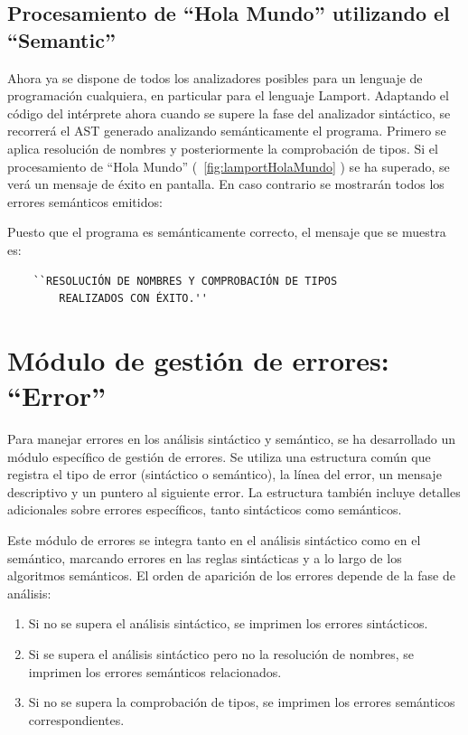 \subsection{Procesamiento de ``Hola Mundo'' utilizando el ``Semantic''}
Ahora ya se dispone de todos los analizadores posibles para un lenguaje de programación cualquiera, en particular para el lenguaje Lamport. Adaptando el código del intérprete ahora cuando se supere la fase del analizador sintáctico, se recorrerá el AST generado analizando semánticamente el programa. Primero se aplica resolución de nombres y posteriormente la comprobación de tipos. Si el procesamiento de ``Hola Mundo'' (~\ref{fig:lamportHolaMundo} ) se ha superado, se verá un mensaje de éxito en pantalla. En caso contrario se mostrarán todos los errores semánticos emitidos:



\noindent
Puesto que el programa es semánticamente correcto, el mensaje que se muestra es:
\begin{verbatim}
    ``RESOLUCIÓN DE NOMBRES Y COMPROBACIÓN DE TIPOS 
        REALIZADOS CON ÉXITO.''
\end{verbatim}

\section{Módulo de gestión de errores: ``Error''}\label{sec:implementacionError}
Para manejar errores en los análisis sintáctico y semántico, se ha desarrollado un módulo específico de gestión de errores. Se utiliza una estructura común  que registra el tipo de error (sintáctico o semántico), la línea del error, un mensaje descriptivo y un puntero al siguiente error. La estructura también incluye detalles adicionales sobre errores específicos, tanto sintácticos como semánticos.

Este módulo de errores se integra tanto en el análisis sintáctico como en el semántico, marcando errores en las reglas sintácticas y a lo largo de los algoritmos semánticos. El orden de aparición de los errores depende de la fase de análisis:

\begin{enumerate}
    \item Si no se supera el análisis sintáctico, se imprimen los errores sintácticos.
    \item Si se supera el análisis sintáctico pero no la resolución de nombres, se imprimen los errores semánticos relacionados.
    \item Si no se supera la comprobación de tipos, se imprimen los errores semánticos correspondientes.
\end{enumerate}


